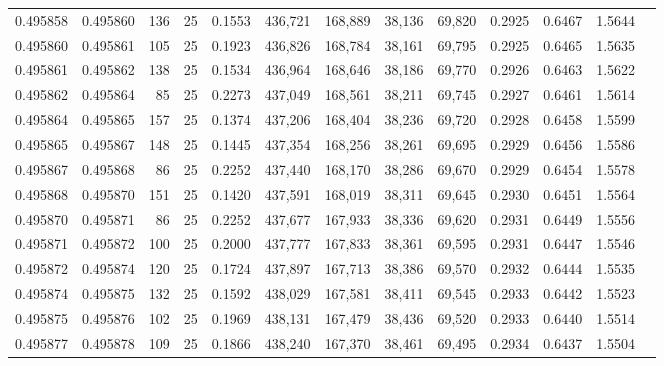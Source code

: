 \begin{tabular}{rrrrrrrrrrrrr}
0.495858 & 0.495860 &   136 &  25 &                                     0.1553 & 436,721 & 168,889 &  38,136 &  69,820 & 0.2925 & 0.6467 & 1.5644 \\
0.495860 & 0.495861 &   105 &  25 &                                     0.1923 & 436,826 & 168,784 &  38,161 &  69,795 & 0.2925 & 0.6465 & 1.5635 \\
0.495861 & 0.495862 &   138 &  25 &                                     0.1534 & 436,964 & 168,646 &  38,186 &  69,770 & 0.2926 & 0.6463 & 1.5622 \\
0.495862 & 0.495864 &    85 &  25 &                                     0.2273 & 437,049 & 168,561 &  38,211 &  69,745 & 0.2927 & 0.6461 & 1.5614 \\
0.495864 & 0.495865 &   157 &  25 &                                     0.1374 & 437,206 & 168,404 &  38,236 &  69,720 & 0.2928 & 0.6458 & 1.5599 \\
0.495865 & 0.495867 &   148 &  25 &                                     0.1445 & 437,354 & 168,256 &  38,261 &  69,695 & 0.2929 & 0.6456 & 1.5586 \\
0.495867 & 0.495868 &    86 &  25 &                                     0.2252 & 437,440 & 168,170 &  38,286 &  69,670 & 0.2929 & 0.6454 & 1.5578 \\
0.495868 & 0.495870 &   151 &  25 &                                     0.1420 & 437,591 & 168,019 &  38,311 &  69,645 & 0.2930 & 0.6451 & 1.5564 \\
0.495870 & 0.495871 &    86 &  25 &                                     0.2252 & 437,677 & 167,933 &  38,336 &  69,620 & 0.2931 & 0.6449 & 1.5556 \\
0.495871 & 0.495872 &   100 &  25 &                                     0.2000 & 437,777 & 167,833 &  38,361 &  69,595 & 0.2931 & 0.6447 & 1.5546 \\
0.495872 & 0.495874 &   120 &  25 &                                     0.1724 & 437,897 & 167,713 &  38,386 &  69,570 & 0.2932 & 0.6444 & 1.5535 \\
0.495874 & 0.495875 &   132 &  25 &                                     0.1592 & 438,029 & 167,581 &  38,411 &  69,545 & 0.2933 & 0.6442 & 1.5523 \\
0.495875 & 0.495876 &   102 &  25 &                                     0.1969 & 438,131 & 167,479 &  38,436 &  69,520 & 0.2933 & 0.6440 & 1.5514 \\
0.495877 & 0.495878 &   109 &  25 &                                     0.1866 & 438,240 & 167,370 &  38,461 &  69,495 & 0.2934 & 0.6437 & 1.5504 \\

\end{tabular}
